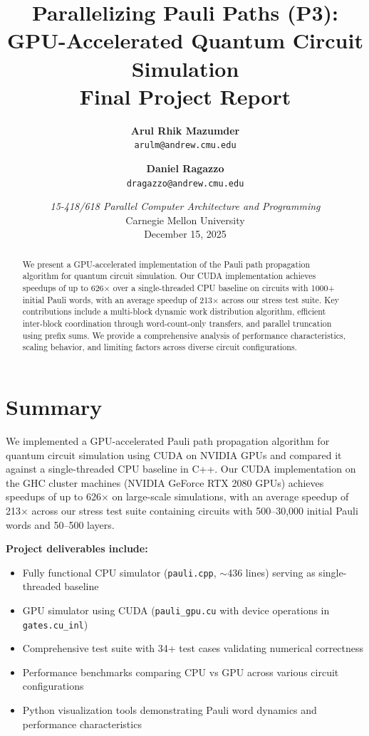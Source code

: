 \documentclass[11pt, a4paper]{article}
\title{%
    \vspace{-1cm}
    {\LARGE\bfseries Parallelizing Pauli Paths (P3):}\\[0.3em]
    {\Large GPU-Accelerated Quantum Circuit Simulation}\\[1em]
    {\large\normalfont Final Project Report}
}
\author{%
    \textbf{Arul Rhik Mazumder}\\
    \texttt{arulm@andrew.cmu.edu}
    \and
    \textbf{Daniel Ragazzo}\\
    \texttt{dragazzo@andrew.cmu.edu}
}
\date{%
    \vspace{0.5em}
    {\itshape 15-418/618 Parallel Computer Architecture and Programming}\\
    Carnegie Mellon University\\[0.5em]
    December 15, 2025
}
\begin{document}
\maketitle
\thispagestyle{empty}

\begin{abstract}
We present a GPU-accelerated implementation of the Pauli path propagation algorithm for quantum circuit simulation. Our CUDA implementation achieves speedups of up to 626$\times$ over a single-threaded CPU baseline on circuits with 1000+ initial Pauli words, with an average speedup of 213$\times$ across our stress test suite. Key contributions include a multi-block dynamic work distribution algorithm, efficient inter-block coordination through word-count-only transfers, and parallel truncation using prefix sums. We provide a comprehensive analysis of performance characteristics, scaling behavior, and limiting factors across diverse circuit configurations.
\end{abstract}

\vspace{1em}

\section{Summary}

We implemented a GPU-accelerated Pauli path propagation algorithm for quantum circuit simulation using CUDA on NVIDIA GPUs and compared it against a single-threaded CPU baseline in C++. Our CUDA implementation on the GHC cluster machines (NVIDIA GeForce RTX 2080 GPUs) achieves speedups of up to 626$\times$ on large-scale simulations, with an average speedup of 213$\times$ across our stress test suite containing circuits with 500--30,000 initial Pauli words and 50--500 layers.

\noindent \textbf{Project deliverables include:}
\begin{itemize}
    \item Fully functional CPU simulator (\texttt{pauli.cpp}, $\sim$436 lines) serving as single-threaded baseline
    \item GPU simulator using CUDA (\texttt{pauli\_gpu.cu} with device operations in \texttt{gates.cu\_inl})
    \item Comprehensive test suite with 34+ test cases validating numerical correctness
    \item Performance benchmarks comparing CPU vs GPU across various circuit configurations
    \item Python visualization tools demonstrating Pauli word dynamics and performance characteristics
\end{itemize}
\end{document}
